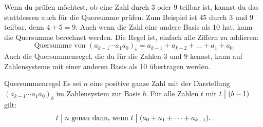 \documentclass[../../main.tex]{subfiles}
\begin{document}
Wenn du prüfen möchtest, ob eine Zahl durch $3$ oder $9$ teilbar ist, kannst du das stattdessen auch für die Quersumme
prüfen. Zum Beispiel ist $45$ durch $3$ und $9$ teilbar, denn $4+5=9$. Auch wenn die Zahl eine andere Basis als 10 hat,
kann die Quersumme berechnet werden. Die Regel ist, einfach alle Ziffern zu addieren:
\[\text{Quersumme von }(a_{k-1}\cdots a_1a_0)_b=a_{k-1}+a_{k-2}+\dots+a_1+a_0\]
Auch die Quersummenregel, die du für die Zahlen $3$ und $9$ kennst, kann auf Zahlensysteme mit einer anderen Basis als
10 übertragen werden.
\begin{theorem}{Quersummenregel}
    Es sei $n$ eine positive ganze Zahl mit der Darstellung $(a_{k-1}\cdots a_1a_0)_b$ im Zahlensystem zur Basis $b$.
    Für alle Zahlen $t$ mit $t\divides (b-1)$ gilt:
    \[t\divides n\text{ genau dann, wenn }t\divides (a_0+a_1+\dots+a_{k-1}).\]
\end{theorem}
\end{document}
